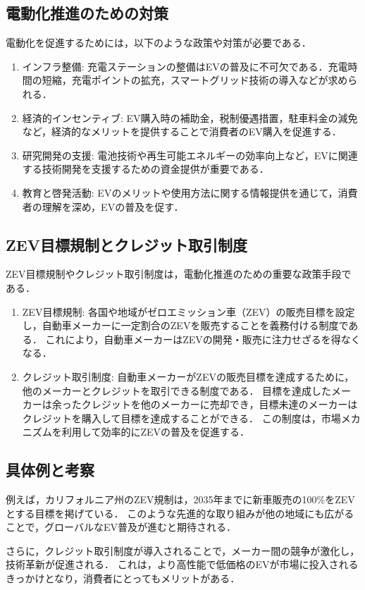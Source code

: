 \documentclass[titlepage,a4paper]{jsarticle}
\begin{document}
\subsection{電動化推進のための対策}
電動化を促進するためには，以下のような政策や対策が必要である．
\begin{enumerate}
  \item インフラ整備: 充電ステーションの整備はEVの普及に不可欠である．充電時間の短縮，充電ポイントの拡充，スマートグリッド技術の導入などが求められる．
  \item 経済的インセンティブ: EV購入時の補助金，税制優遇措置，駐車料金の減免など，経済的なメリットを提供することで消費者のEV購入を促進する．
  \item 研究開発の支援: 電池技術や再生可能エネルギーの効率向上など，EVに関連する技術開発を支援するための資金提供が重要である．
  \item 教育と啓発活動: EVのメリットや使用方法に関する情報提供を通じて，消費者の理解を深め，EVの普及を促す．
\end{enumerate}
\subsection{ZEV目標規制とクレジット取引制度}
ZEV目標規制やクレジット取引制度は，電動化推進のための重要な政策手段である．
\begin{enumerate}
  \item ZEV目標規制: 各国や地域がゼロエミッション車（ZEV）の販売目標を設定し，自動車メーカーに一定割合のZEVを販売することを義務付ける制度である．
        これにより，自動車メーカーはZEVの開発・販売に注力せざるを得なくなる．
  \item クレジット取引制度: 自動車メーカーがZEVの販売目標を達成するために，他のメーカーとクレジットを取引できる制度である．
        目標を達成したメーカーは余ったクレジットを他のメーカーに売却でき，目標未達のメーカーはクレジットを購入して目標を達成することができる．
        この制度は，市場メカニズムを利用して効率的にZEVの普及を促進する．
\end{enumerate}
\subsection{具体例と考察}
例えば，カリフォルニア州のZEV規制は，2035年までに新車販売の100\%をZEVとする目標を掲げている．
このような先進的な取り組みが他の地域にも広がることで，グローバルなEV普及が進むと期待される．

さらに，クレジット取引制度が導入されることで，メーカー間の競争が激化し，技術革新が促進される．
これは，より高性能で低価格のEVが市場に投入されるきっかけとなり，消費者にとってもメリットがある．
\end{document}
